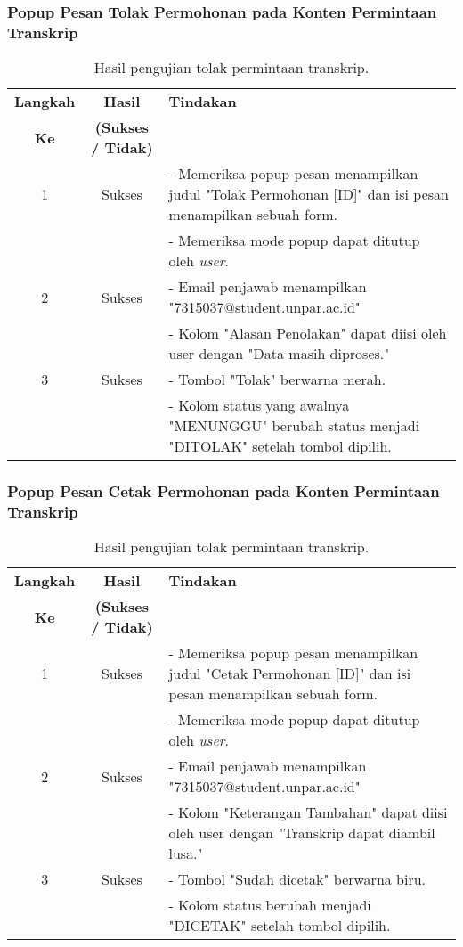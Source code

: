 \subsubsection{Popup Pesan Tolak Permohonan pada Konten Permintaan Transkrip}
\begin{table}[H]
	\centering 
	\caption{Hasil pengujian tolak permintaan transkrip.}
	\label{hasil:TolakPermintaanTranskrip}
	\begin{tabular}{|c| c| p{}|}
		\toprule
		\textbf{Langkah} & \textbf{Hasil} & \textbf{Tindakan}\\
		\textbf{Ke} & \textbf{(Sukses / Tidak)} &\\
		\midrule
		1&Sukses& - Memeriksa popup pesan menampilkan judul "Tolak Permohonan [ID]" dan isi pesan menampilkan sebuah form.\\
		&& - Memeriksa mode popup dapat ditutup oleh \textit{user}.\\
		\hline
		2&Sukses& - Email penjawab menampilkan "7315037@student.unpar.ac.id"\\
		&& - Kolom "Alasan Penolakan" dapat diisi oleh user dengan "Data masih diproses."\\
		\hline
		3&Sukses&- Tombol "Tolak" berwarna merah.\\
		&& - Kolom status yang awalnya "MENUNGGU" berubah status menjadi "DITOLAK" setelah tombol dipilih.\\		
		\bottomrule		
	\end{tabular} 
\end{table}

\subsubsection{Popup Pesan Cetak Permohonan pada Konten Permintaan Transkrip}
\begin{table}[H]
	\centering 
	\caption{Hasil pengujian tolak permintaan transkrip.}
	\label{hasil:CetakPermintaanTranskrip}
	\begin{tabular}{|c| c| p{}|}
		\toprule
		\textbf{Langkah} & \textbf{Hasil} & \textbf{Tindakan}\\
		\textbf{Ke} & \textbf{(Sukses / Tidak)} &\\
		\midrule
		1&Sukses& - Memeriksa popup pesan menampilkan judul "Cetak Permohonan [ID]" dan isi pesan menampilkan sebuah form.\\
		&& - Memeriksa mode popup dapat ditutup oleh \textit{user}.\\
		\hline
		2&Sukses& - Email penjawab menampilkan "7315037@student.unpar.ac.id"\\
		&& - Kolom "Keterangan Tambahan" dapat diisi oleh user dengan "Transkrip dapat diambil lusa."\\
		\hline
		3&Sukses&- Tombol "Sudah dicetak" berwarna biru.\\
		&& - Kolom status berubah menjadi "DICETAK" setelah tombol dipilih.\\		
		\bottomrule		
	\end{tabular} 
\end{table}

